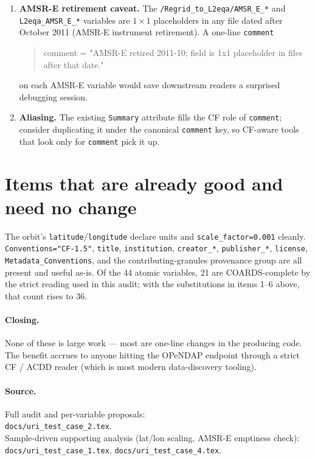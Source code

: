 \documentclass[11pt]{article}
\begin{document}
\begin{enumerate}[leftmargin=*,topsep=2pt,start=7]
  \item \textbf{AMSR-E retirement caveat.} The
    \texttt{/Regrid\_to\_L2eqa/AMSR\_E\_*} and
    \texttt{L2eqa\_AMSR\_E\_*} variables are $1\times 1$
    placeholders in any file dated after October 2011 (AMSR-E
    instrument retirement). A one-line \texttt{comment}
    \begin{quote}\ttfamily
      comment = "AMSR-E retired 2011-10; field is 1x1 placeholder
      in files after that date."
    \end{quote}
    on each AMSR-E variable would save downstream readers a
    surprised debugging session.

  \item \textbf{Aliasing.} The existing \texttt{Summary} attribute
    fills the CF role of \texttt{comment}; consider duplicating it
    under the canonical \texttt{comment} key, so CF-aware tools
    that look only for \texttt{comment} pick it up.
\end{enumerate}

\section*{Items that are already good and need no change}

The orbit's \texttt{latitude}/\texttt{longitude} declare units and
\texttt{scale\_factor=0.001} cleanly. \texttt{Conventions="CF-1.5"},
\texttt{title}, \texttt{institution}, \texttt{creator\_*},
\texttt{publisher\_*}, \texttt{license},
\texttt{Metadata\_Conventions}, and the contributing-granules
provenance group are all present and useful as-is. Of the 44
atomic variables, 21 are COARDS-complete by the strict reading
used in this audit; with the substitutions in items 1--6 above,
that count rises to 36.

\paragraph{Closing.}
None of these is large work --- most are one-line changes in the
producing code. The benefit accrues to anyone hitting the OPeNDAP
endpoint through a strict CF / ACDD reader (which is most modern
data-discovery tooling).

\paragraph{Source.}
Full audit and per-variable proposals: \\
\texttt{docs/uri\_test\_case\_2.tex}. \\
Sample-driven supporting analysis (lat/lon scaling, AMSR-E
emptiness check): \texttt{docs/uri\_test\_case\_1.tex},
\texttt{docs/uri\_test\_case\_4.tex}.
\end{document}
